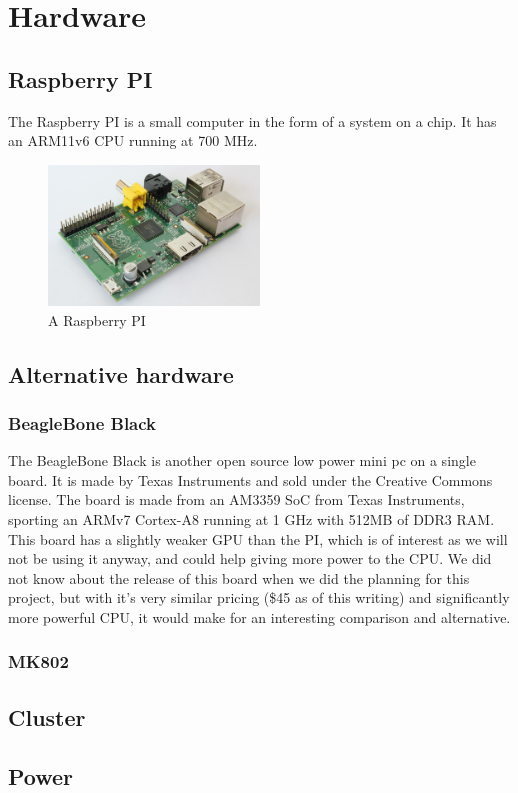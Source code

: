 \section{Hardware}
\subsection{Raspberry PI}
The Raspberry PI is a small computer in the form of a system on a chip. It has an ARM11v6 CPU running at 700 MHz.
\begin{figure}
    \centering
    \includegraphics[width=0.5\textwidth]{hardware/RaspberryPi}
    \caption{A Raspberry PI}
    \label{fig:raspberrypi_hw}
\end{figure}

\subsection{Alternative hardware}
\subsubsection{BeagleBone Black}
The BeagleBone Black is another open source low power mini pc on a single board. It is made by Texas Instruments and sold under the Creative Commons license.
The board is made from an AM3359 SoC from Texas Instruments, sporting an ARMv7 Cortex-A8 running at 1 GHz with 512MB of DDR3 RAM. This board has a slightly weaker GPU than the PI, which is of interest as we will not be using it anyway, and could help giving more power to the CPU.
We did not know about the release of this board when we did the planning for this project, but with it's very similar pricing (\$45 as of this writing) and significantly more powerful CPU, it would make for an interesting comparison and alternative.
\subsubsection{MK802}

\subsection{Cluster}
\subsection{Power}
